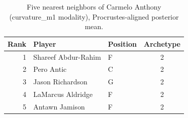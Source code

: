 \begin{table}[htbp]
  \centering\small
  \begin{tabular}{rllc}
    \toprule
    Rank & Player & Position & Archetype \\
    \midrule
    1 & Shareef Abdur-Rahim & F & 2 \\
    2 & Pero Antic & C & 2 \\
    3 & Jason Richardson & G & 2 \\
    4 & LaMarcus Aldridge & F & 2 \\
    5 & Antawn Jamison & F & 2 \\
    \bottomrule
  \end{tabular}
  \caption{Five nearest neighbors of Carmelo Anthony (curvature_m1 modality), Procrustes-aligned posterior mean.}
  \label{tab:Carmelo_Anthony_neighbors_curvature_m1}
\end{table}

